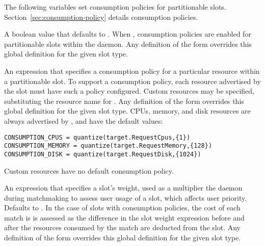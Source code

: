 The following variables set consumption policies for partitionable slots.
Section~\ref{sec:consumption-policy} details consumption policies.

\begin{description}

\label{param:ConsumptionPolicy}
\item[\Macro{CONSUMPTION\_POLICY}]
  A boolean value that defaults to .
  When , consumption policies are enabled for partitionable
  slots within the  daemon.  
  Any definition of the form 
  overrides this global definition for the given slot type.
  
\label{param:ConsumptionResource}
\item[\Macro{CONSUMPTION\_<Resource>}]
  An expression that specifies a consumption policy for a particular 
  resource within a partitionable slot.  
  To support a consumption policy, each resource advertised by the
  slot must have such a policy configured.
  Custom resources may be specified, substituting the resource name
  for .
  Any definition of the form 
  overrides this global definition for the given slot type.
  CPUs, memory, and disk resources
  are always advertised by , and have the default values:
\begin{verbatim}
CONSUMPTION_CPUS = quantize(target.RequestCpus,{1})
CONSUMPTION_MEMORY = quantize(target.RequestMemory,{128})
CONSUMPTION_DISK = quantize(target.RequestDisk,{1024})
\end{verbatim}
  Custom resources have no default consumption policy.

\label{param:SlotWeight}
\item[\Macro{SLOT\_WEIGHT}]
  An expression that specifies a slot's weight, used as a multiplier
  the  daemon during matchmaking to assess user usage
  of a slot, which affects user priority.
  Defaults to .  
  In the case of slots with consumption policies, the cost of each match is
  is assessed as the difference in the slot weight expression before and after
  the resources consumed by the match are deducted from the slot.
  Any definition of the form 
  overrides this global definition for the given slot type.


\end{description}
